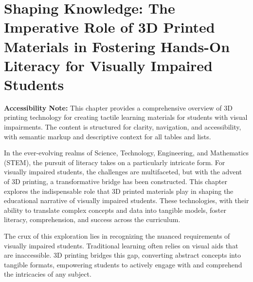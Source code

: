 \chapter{Shaping Knowledge: The Imperative Role of 3D Printed Materials in Fostering Hands-On Literacy for Visually Impaired Students}\label{ch5:3d-printing}
\raggedright

\begin{raggedright}
	\textbf{Accessibility Note:} This chapter provides a comprehensive overview of 3D printing technology for creating tactile learning materials for students with visual impairments. The content is structured for clarity, navigation, and accessibility, with semantic markup and descriptive context for all tables and lists.
\end{raggedright}

In the ever-evolving realms of Science, Technology, Engineering, and Mathematics (STEM), the pursuit of literacy takes on a particularly intricate form. For visually impaired students, the challenges are multifaceted, but with the advent of 3D printing, a transformative bridge has been constructed. This chapter explores the indispensable role that 3D printed materials play in shaping the educational narrative of visually impaired students. These technologies, with their ability to translate complex concepts and data into tangible models, foster literacy, comprehension, and success across the curriculum.

The crux of this exploration lies in recognizing the nuanced requirements of visually impaired students. Traditional learning often relies on visual aids that are inaccessible. 3D printing bridges this gap, converting abstract concepts into tangible formats, empowering students to actively engage with and comprehend the intricacies of any subject.

